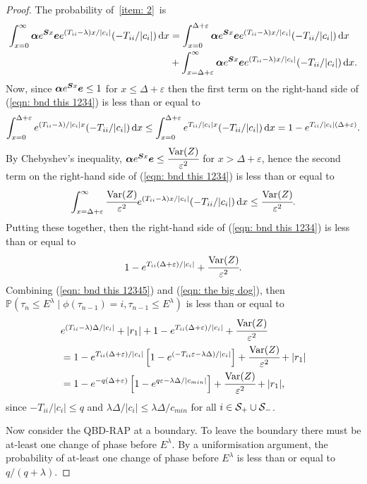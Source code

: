 \begin{proof}
	The probability of~\ref{item: 2}~is 
	\begin{align}
		\nonumber\int_{x=0}^\infty \boldsymbol \alpha e^{\boldsymbol{S}x}\boldsymbol e e^{(T_{ii}-\lambda)x/|c_i|}(-T_{ii}/|c_i|)\, \mathrm{d} x 
		&= \int_{x=0}^{\Delta+\varepsilon} \boldsymbol \alpha e^{\boldsymbol{S}x}\boldsymbol ee^{(T_{ii}-\lambda)x/|c_i|}(-T_{ii}/|c_i|)\, \mathrm{d} x 
		\\&{}+\int_{x=\Delta+\varepsilon}^\infty \boldsymbol \alpha e^{\boldsymbol{S}x}\boldsymbol e e^{(T_{ii}-\lambda)x/|c_i|}(-T_{ii}/|c_i|)\, \mathrm{d} x.\label{eqn: bnd this 1234}
	\end{align}
	Now, since \(\boldsymbol \alpha e^{\boldsymbol{S}x}\boldsymbol e\leq 1\) for \(x\leq \Delta+\varepsilon\) then the first term on the right-hand side of (\ref{eqn: bnd this 1234}) is less than or equal to 
	\[\displaystyle \int_{x=0}^{\Delta+\varepsilon} e^{(T_{ii}-\lambda)/|c_i|x}(-T_{ii}/|c_i|)\, \mathrm{d} x \leq \int_{x=0}^{\Delta+\varepsilon} e^{T_{ii}/|c_i|x}(-T_{ii}/|c_i|)\, \mathrm{d} x = 1-e^{T_{ii}/|c_i|(\Delta+\varepsilon)}.\]
	By Chebyshev's inequality, \(\boldsymbol \alpha e^{\boldsymbol{S}x}\boldsymbol e\leq \cfrac{\mathrm{Var}(Z)}{\varepsilon^2}\) for \(x> \Delta+\varepsilon\), hence the second term on the right-hand side of (\ref{eqn: bnd this 1234}) is less than or equal to 
	\[\displaystyle \int_{x=\Delta+\varepsilon}^\infty \cfrac{\mathrm{Var}(Z)}{\varepsilon^2} e^{(T_{ii}-\lambda)x/|c_i|}(-T_{ii}/|c_i|)\, \mathrm{d} x \leq  \cfrac{\mathrm{Var}(Z)}{\varepsilon^2}.\]
	Putting these together, then the right-hand side of (\ref{eqn: bnd this 1234}) is less than or equal to
	\begin{align}
		1-e^{T_{ii}(\Delta+\varepsilon)/|c_i|} + \cfrac{\mathrm{Var}(Z)}{\varepsilon^2}.\label{eqn: the big dog}
	\end{align}	
	Combining (\ref{eqn: bnd this 12345}) and (\ref{eqn: the big dog}), then \(\mathbb P(\tau_n\leq E^\lambda  \mid \phi(\tau_{n-1})=i , \tau_{n-1}\leq  E^\lambda)\) is less than or equal to 
	\begin{align}
		&e^{(T_{ii}-\lambda)\Delta/|c_i|} + |r_1| + 1-e^{T_{ii}(\Delta+\varepsilon)/|c_i|} + \cfrac{\mathrm{Var}(Z)}{\varepsilon^2}\nonumber
		\\&= 1-e^{T_{ii}(\Delta+\varepsilon)/|c_i|}\left[1-e^{(-T_{ii}\varepsilon-\lambda \Delta)/|c_i|}\right] + \cfrac{\mathrm{Var}(Z)}{\varepsilon^2} + |r_1| \nonumber 
		\\&= 1-e^{-q(\Delta+\varepsilon)}\left[1-e^{q\varepsilon-\lambda \Delta/|c_{min}|}\right] + \cfrac{\mathrm{Var}(Z)}{\varepsilon^2} + |r_1|,
	\end{align}
	since \(-T_{ii}/|c_i|\leq q\) and \(\lambda \Delta/|c_i| \leq \lambda \Delta/c_{min}\) for all \(i\in\mathcal S_+\cup \mathcal{S}_-\). 
	
	Now consider the QBD-RAP at a boundary. To leave the boundary there must be at-least one change of phase before \(E^\lambda\). By a uniformisation argument, the probability of at-least one change of phase before \(E^\lambda\) is less than or equal to \(q/(q+\lambda)\). 
\end{proof}

